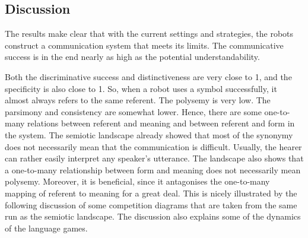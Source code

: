 \subsection{Discussion}

The results make clear that with the current settings and strategies, the robots construct a communication system that meets its limits. The communicative success is in the end nearly as high as the potential understandability. 

Both the discriminative success and distinctiveness are very close to 1, and the specificity is also close to 1. So, when a robot uses a symbol successfully, it almost always refers to the same referent. The polysemy is very low. The parsimony and consistency are somewhat lower. Hence, there are some one-to-many relations between referent and meaning and between referent and form in the system. The semiotic landscape already showed that most of the synonymy does not necessarily mean that the communication is difficult. Usually, the hearer can rather easily interpret any speaker's utterance. The landscape also shows that a one-to-many relationship between form and meaning does not necessarily mean polysemy. Moreover, it is beneficial, since it antagonises the one-to-many mapping of referent to meaning for a great deal. This is nicely illustrated by the following discussion of some competition diagrams that are taken from the same run as the semiotic landscape. The discussion also explains some of the dynamics of the language games.

